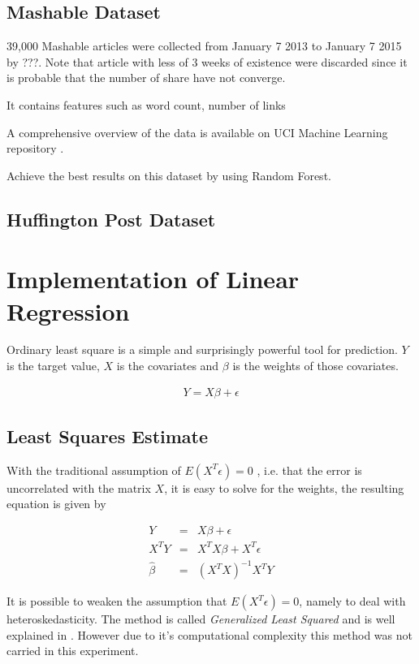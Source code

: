 \documentclass[conference]{IEEEtran}\usepackage[]{graphicx}\usepackage[]{color}
\begin{document}
\subsection{Mashable Dataset} 

39,000 Mashable articles were collected from January 7 2013 to January 7 2015 by
???. Note that article with less of 3 weeks of existence were discarded since
it is probable that the number of share have not converge.

It contains features such as word count, number of links

A comprehensive overview of the data is available on UCI Machine Learning
repository \cite{Lichman:2013}. 

Achieve the best results on this dataset by using Random Forest.
\cite{fernandes2015proactive}  

\subsection{Huffington Post Dataset}

\section{Implementation of Linear Regression}

Ordinary least square is a simple and surprisingly powerful tool for prediction.
$Y$ is the target value, $X$ is the covariates and $\beta$ is the weights of
those covariates.

\begin{eqnarray*}
  Y = X \beta + \epsilon
\end{eqnarray*}


\subsection{Least Squares Estimate}

With the traditional assumption of $E(X^T \epsilon) = 0$
\cite{davidson2004econometric}, i.e. that the error is 
uncorrelated with the matrix $X$, it is easy to solve for the weights, the
resulting equation is given by

\begin{eqnarray*}
  Y &=& X \beta + \epsilon \\
  X^T Y &=& X^T X \beta + X^T \epsilon \\
  \hat{\beta} &=& (X^TX)^{-1}X^TY 
\end{eqnarray*}

It is possible to weaken the assumption that $E(X^T \epsilon) = 0$, namely to
deal with heteroskedasticity. The method is called 
\textit{Generalized Least Squared} and is well explained in
\cite{davidson2004econometric}. However due to it's computational complexity 
this method was not carried in this experiment.   
\end{document}
